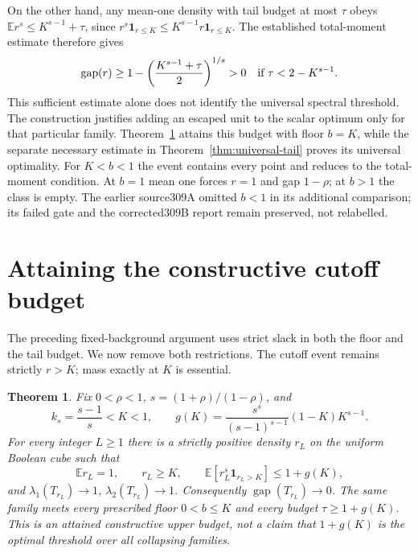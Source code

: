 \documentclass[11pt]{article}
\newtheorem{theorem}{Theorem}
\newcommand{\gap}{\operatorname{gap}}
\begin{document}
On the other hand, any mean-one density with tail budget at most
$\tau$ obeys $\mathbb Er^s\le K^{s-1}+\tau$, since
$r^s\mathbf1_{r\le K}\le K^{s-1}r\mathbf1_{r\le K}$.
The established total-moment estimate therefore gives
\[
 \gap(r)\ge1-\left(\frac{K^{s-1}+\tau}{2}\right)^{1/s}>0
 \quad\hbox{if }\tau<2-K^{s-1}.
\]
This sufficient estimate alone does not identify the universal spectral
threshold. The construction justifies adding an escaped unit to the scalar
optimum only for that particular family. Theorem~\ref{thm:attained-cutoff}
attains this budget with floor $b=K$, while the separate necessary estimate
in Theorem~\ref{thm:universal-tail} proves its universal optimality.
For $K<b<1$ the event contains every point
and reduces to the total-moment condition. At $b=1$ mean one forces
$r=1$ and gap $1-\rho$; at $b>1$ the class is empty. The earlier
source309A omitted $b<1$ in its additional comparison; its failed
gate and the corrected309B report remain preserved, not relabelled.


\section{Attaining the constructive cutoff budget}\label{sec:attained-cutoff}
The preceding fixed-background argument uses strict slack in both the
floor and the tail budget. We now remove both restrictions. The cutoff
event remains strictly $r>K$; mass exactly at $K$ is essential.

\begin{theorem}\label{thm:attained-cutoff}
Fix $0<\rho<1$, $s=(1+\rho)/(1-\rho)$, and
\[
 k_s=\frac{s-1}{s}<K<1,\qquad
 g(K)=\frac{s^s}{(s-1)^{s-1}}(1-K)K^{s-1}.
\]
For every integer $L\ge1$ there is a strictly positive density $r_L$
on the uniform Boolean cube such that
\[
 \mathbb Er_L=1,\qquad r_L\ge K,\qquad
 \mathbb E[r_L^s\mathbf1_{r_L>K}]\le1+g(K),
\]
and $\lambda_1(T_{r_L})\to1$, $\lambda_2(T_{r_L})\to1$.
Consequently $\gap(T_{r_L})\to0$. The same family meets every
prescribed floor $0<b\le K$ and every budget $\tau\ge1+g(K)$.
This is an attained constructive upper budget, not a claim that
$1+g(K)$ is the optimal threshold over all collapsing families.
\end{theorem}
\end{document}
